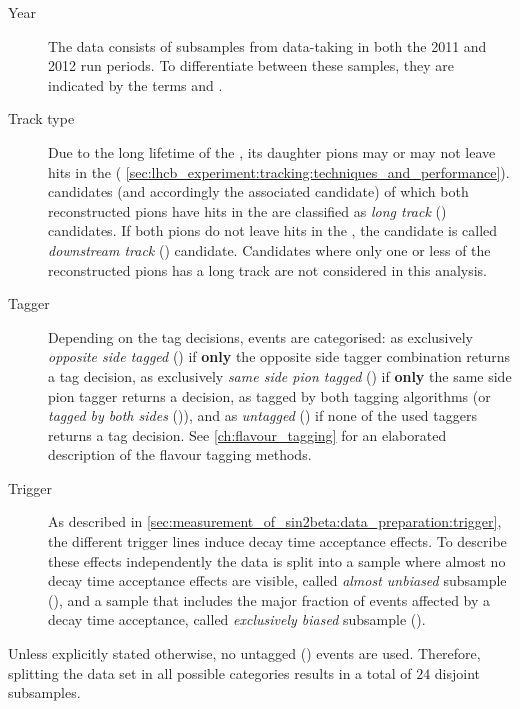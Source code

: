 \begin{description}
  \item[Year] The data consists of subsamples from data-taking in both the 2011
and 2012 run periods. To differentiate between these samples, they are indicated
by the terms \textbf{\catOO} and \textbf{\catOT}.

  \item[Track type] Due to the long lifetime of the \KS, its daughter pions may
or may not leave hits in the \VELO (\cf
\cref{sec:lhcb_experiment:tracking:techniques_and_performance}). \KS candidates
(and accordingly the associated \Bmeson candidate) of which both reconstructed
pions have hits in the \VELO are classified as \emph{long track}
(\textbf{\catLL}) candidates. If both pions do not leave hits in the \VELO, the
candidate is called \emph{downstream track} (\textbf{\catDD}) candidate.
Candidates where only one or less of the reconstructed pions has a long track
are not considered in this analysis.
  
  \item[Tagger] Depending on the tag decisions, events are categorised: as
  exclusively \emph{opposite side tagged} (\textbf{\catOS}) if \textbf{only} the
opposite side tagger combination returns a tag decision, as exclusively
\emph{same side pion tagged} (\textbf{\catSS}) if \textbf{only} the same side
pion tagger returns a decision, as tagged by both tagging algorithms (or
\emph{tagged by both sides} (\textbf{\catBS})), and as \emph{untagged}
(\textbf{\catUT}) if none of the used taggers returns a tag decision. See
\cref{ch:flavour_tagging} for an elaborated description of the flavour tagging
methods.
  
  \item[Trigger] As described in
\cref{sec:measurement_of_sin2beta:data_preparation:trigger}, the different
trigger lines induce decay time acceptance effects. To describe these effects
independently the data is split into a sample where almost no decay time
acceptance effects are visible, called \emph{almost unbiased} subsample
(\textbf{\catAU}), and a sample that includes the major fraction of events
affected by a decay time acceptance, called \emph{exclusively biased} subsample
(\textbf{\catEB}).
\end{description}

Unless explicitly stated otherwise, no untagged (\textbf{\catUT}) events are
used. Therefore, splitting the data set in all possible categories results in a
total of $\num{24}$ disjoint subsamples.

